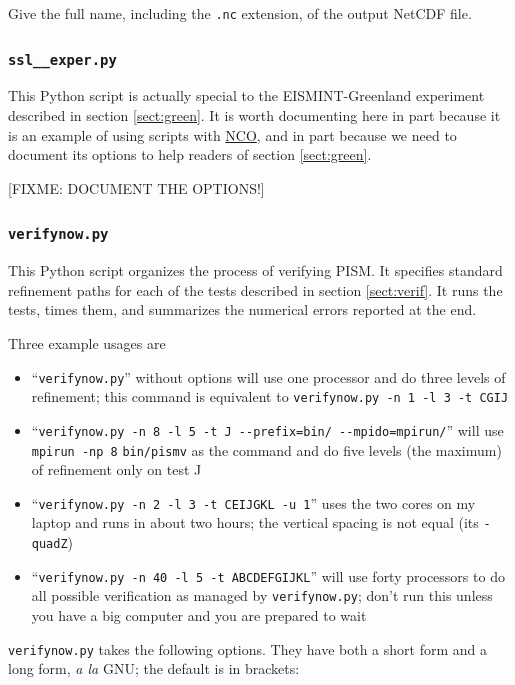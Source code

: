 \documentclass[11pt,final]{amsart}
\newcommand{\und}{\_\!\_}
\begin{document}
\scriptoptdef{o}{out}{series\und out.nc} Give the full name, including the \verb|.nc| extension, of the output NetCDF file.



\subsubsection*{\Large{\texttt{ssl\und exper.py}}}  This Python script is actually special to the EISMINT-Greenland experiment described in section \ref{sect:green}.  It is worth documenting here in part because it is an example of using scripts with \href{http://nco.sourceforge.net/}{NCO}, and in part because we need to document its options to help readers of section \ref{sect:green}.

[FIXME: DOCUMENT THE OPTIONS!]


\subsubsection*{\Large{\texttt{verifynow.py}}}  This Python script organizes the process of verifying PISM.  It specifies standard refinement paths for each of the tests described in section \ref{sect:verif}.  It runs the tests, times them, and summarizes the numerical errors reported at the end.

Three example usages are \begin{itemize}
\item ``\verb|verifynow.py|'' without options will use one processor and do three levels of refinement; this command is equivalent to \verb|verifynow.py -n 1 -l 3 -t CGIJ|
\item ``\verb|verifynow.py -n 8 -l 5 -t J --prefix=bin/ --mpido=mpirun/|'' will use \verb|mpirun -np 8| \verb|bin/pismv| as the command and do five levels (the maximum) of refinement only on test J
\item ``\verb|verifynow.py -n 2 -l 3 -t CEIJGKL -u 1|'' uses the two cores on my laptop and runs in about two hours; the vertical spacing is not equal (its \verb|-quadZ|)
\item ``\verb|verifynow.py -n 40 -l 5 -t ABCDEFGIJKL|'' will use forty processors to do all possible verification as managed by \verb|verifynow.py|; don't run this unless you have a big computer and you are prepared to wait
\end{itemize}

\verb|verifynow.py| takes the following options.  They have both a short form and a long form, \emph{a la} GNU; the default is in brackets:
\end{document}
